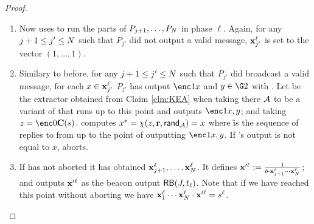 \documentclass{article}
\begin{document}
\begin{proof}
\begin{enumerate}
\begin{enumerate}
\item 
Now \advvprime uses \adv to run the parts of $P_{j+1},\ldots,P_N$ in phase $\ell$.
Again, for any $j+1\leq j' \leq N$ such that $P_{j'}$ did not output a valid message, $\mathbf{x}^\ell_{j'}$ is set to the vector $(1,\ldots,1)$.
\item \label{itm:KEA2} Similary to before, for any $j+1\leq j' \leq N$ such that $P_{j'}$ did broadcast a valid message, for each $x\in \mathbf{x}^\ell_{j'}$
$P_{j'}$ has output $\enc1{x}$ and $y\in \G2$ with .
Let \ext be the extractor obtained from Claim \ref{clm:KEA} when taking there $\mathcal{A}$ to be a variant of \advvprime that runs up to this point and outputs $\enc1{x},y$; and taking $z=\enc0{\circ(s)}$.  \advvprime computes $x^* = \chi(z,\textbf{r},\mathsf{rand_{\mathcal{A}}})= x$  where \r is the sequence of replies to \advvprime from \RO up to the point of outputting $\enc1{x},y$.
If \ext's output is not equal to $x$, \advv aborts. 

\item If \advvprime has not aborted it has obtained $\mathbf{x}^\ell_{j+1},\ldots,\mathbf{x}^\ell_{N}$.
It defines $\mathbf{x}'^\ell := \frac{1}{b\cdot \mathbf{x}^\ell_{j+1}\cdots\mathbf{x}^\ell_{N}}$;
and outputs $\mathbf{x}'^\ell$ as the beacon output $\mathsf{\mathsf {RB}}(J,t_\ell)$. 
Note that if we have reached this point without aborting we have $\mathbf{x}_1^\ell\cdots\mathbf{x}_N^\ell \cdot \mathbf{x}'^\ell = s^\ell$.



\end{enumerate}
\end{enumerate}
\end{proof}
\end{document}
